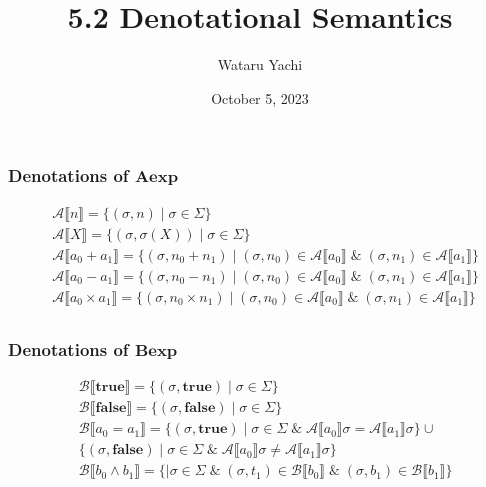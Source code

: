 \documentclass[12pt,aspectratio=169]{beamer}
\title{5.2 Denotational Semantics}
\author{Wataru Yachi}
\institute{JAIST}
\date{October 5, 2023}
\newcommand{\Aexp}{\mathbf{Aexp}}
\newcommand{\Bexp}{\mathbf{Bexp}}
\newcommand{\denoA}[1]{\mathcal{A} \llbracket #1 \rrbracket}
\newcommand{\denoB}[1]{\mathcal{B} \llbracket #1 \rrbracket}
\newcommand{\true}{\mathbf{true}}
\newcommand{\false}{\mathbf{false}}
\begin{document}
\maketitle

\begin{frame}
    \frametitle{Denotations of $\Aexp$}
    \begin{definition}
        \begin{align*}
            & \denoA{n} = \{(\sigma,n) \mid \sigma \in \Sigma \}\\
            & \denoA{X} = \{ (\sigma, \sigma(X)) \mid \sigma \in \Sigma \}\\
            & \denoA{a_0 + a_1} = \{(\sigma, n_0 + n_1) \mid
                (\sigma, n_0) \in \denoA{a_0} \; \& \; (\sigma, n_1) \in \denoA{a_1}\}\\
            & \denoA{a_0 - a_1} = \{(\sigma, n_0 - n_1) \mid
                (\sigma, n_0) \in \denoA{a_0} \; \& \; (\sigma, n_1) \in \denoA{a_1}\}\\
            & \denoA{a_0 \times a_1} = \{(\sigma, n_0 \times n_1) \mid
                (\sigma, n_0) \in \denoA{a_0} \; \& \; (\sigma, n_1) \in \denoA{a_1}\}\\
        \end{align*}
    \end{definition}
    \begin{example}
        
    \end{example}
\end{frame}

\begin{frame}
    \frametitle{Denotations of $\Bexp$}
    \begin{definition}
        \begin{align*}
            & \denoB{\true} = \{(\sigma, \true) \mid \sigma \in \Sigma\} \\
            & \denoB{\false} = \{ (\sigma,\false) \mid \sigma \in \Sigma\} \\
            & \denoB{a_0 = a_1} =
            \{ (\sigma, \true) \mid \sigma \in \Sigma \; \& \; \denoA{a_0}\sigma = \denoA{a_1}\sigma\}\cup\\
            & \{ (\sigma, \false) \mid \sigma \in \Sigma \; \& \; \denoA{a_0}\sigma \neq \denoA{a_1}\sigma\}\\
            & \denoB{b_0 \land b_1} = \{ \mid \sigma \in \Sigma \; \& \; (\sigma,t_1) \in \denoB{b_0} \; \& \; (\sigma,b_1) \in \denoB{b_1} \}
        \end{align*}
    \end{definition}
\end{frame}
\begin{example}

\end{example}
\end{document}
